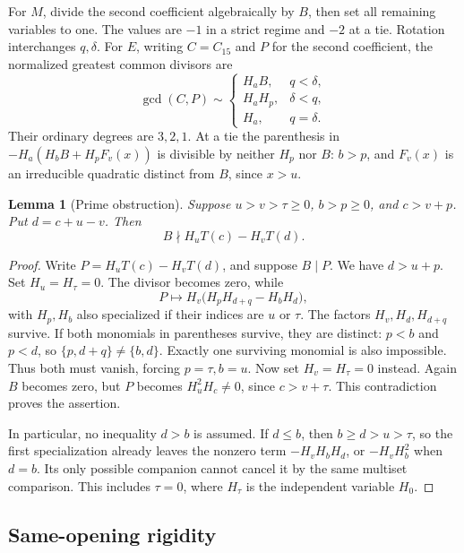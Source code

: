 \documentclass[11pt,a4paper]{amsart}
\numberwithin{equation}{section}
\theoremstyle{plain}
\newtheorem{lemma}[theorem]{Lemma}
\theoremstyle{definition}
\begin{document}
For \(M\), divide the second coefficient algebraically by \(B\),
then set all remaining variables to one.  The values are \(-1\) in
a strict regime and \(-2\) at a tie.  Rotation interchanges
\(q,\delta\).  For \(E\), writing \(C=C_{15}\) and \(P\) for the
second coefficient, the normalized greatest common divisors are
\[
 \gcd(C,P)\sim
 \begin{cases}
 H_aB,&q<\delta,\\
 H_aH_p,&\delta<q,\\
 H_a,&q=\delta.
 \end{cases}
\]
Their ordinary degrees are \(3,2,1\).  At a tie the parenthesis in
\(-H_a(H_bB+H_pF_v(x))\) is divisible by neither \(H_p\) nor \(B\):
\(b>p\), and \(F_v(x)\) is an irreducible quadratic distinct from
\(B\), since \(x>u\).  

\begin{lemma}[Prime obstruction]\label{lem:five-prime}
Suppose \(u>v>\tau\ge0\), \(b>p\ge0\), and \(c>v+p\).  Put
\(d=c+u-v\).  Then
\[
 B\nmid H_uT(c)-H_vT(d).
\]
\end{lemma}

\begin{proof}
Write \(P=H_uT(c)-H_vT(d)\), and suppose \(B\mid P\).  We have
\(d>u+p\).  Set \(H_u=H_\tau=0\).  The divisor becomes zero, while
\[
 P\longmapsto
 H_v\bigl(H_pH_{d+q}-H_bH_d\bigr),
\]
with \(H_p,H_b\) also specialized if their indices are \(u\) or
\(\tau\).  The factors \(H_v,H_d,H_{d+q}\) survive.  If both
monomials in parentheses survive, they are distinct: \(p<b\) and
\(p<d\), so \(\{p,d+q\}\ne\{b,d\}\).  Exactly one surviving
monomial is also impossible.  Thus both must vanish, forcing
\(p=\tau,b=u\).  Now set \(H_v=H_\tau=0\) instead.  Again \(B\)
becomes zero, but \(P\) becomes \(H_u^2H_c\ne0\), since
\(c>v+\tau\).  This contradiction proves the assertion.  

In particular, no inequality \(d>b\) is assumed.  If \(d\le b\),
then \(b\ge d>u>\tau\), so the first specialization already leaves
the nonzero term \(-H_vH_bH_d\), or \(-H_vH_b^2\) when \(d=b\).  
Its only possible companion cannot cancel it by the same multiset
comparison.  This includes \(\tau=0\), where \(H_\tau\) is the
independent variable \(H_0\).  
\end{proof}

\subsection{Same-opening rigidity}
\end{document}
